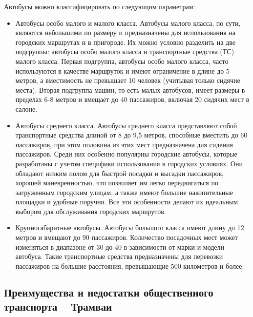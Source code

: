 Автобусы можно классифицировать по следующим параметрам:
\begin{itemize}
	\item Автобусы особо малого и малого класса. Автобусы малого класса, по сути, являются небольшими по размеру и предназначены для использования на городских маршрутах и в пригороде. Их можно условно разделить на две подгруппы: автобусы особо малого класса и транспортные средства (ТС) малого класса.
	Первая подгруппа, автобусы особо малого класса, часто используются в качестве маршруток и имеют ограничение в длине до 5 метров, а вместимость не превышает 10 человек (учитывая только сидячие места).
	Вторая подгруппа машин, то есть малых автобусов, имеет размеры в пределах 6-8 метров и вмещает до 40 пассажиров, включая 20 сидячих мест в салоне.
	\item Автобусы среднего класса. Автобусы среднего класса представляют собой транспортные средства длиной от 8 до 9,5 метров, способные вместить до 60 пассажиров, при этом половина из этих мест предназначена для сидения пассажиров. Среди них особенно популярны городские автобусы, которые разработаны с учетом специфики использования в городских условиях. Они обладают низким полом для быстрой посадки и высадки пассажиров, хорошей маневренностью, что позволяет им легко передвигаться по загруженным городским улицам, а также имеют большие накопительные площадки и удобные поручни. Все эти особенности делают их идеальным выбором для обслуживания городских маршрутов.
	\item Крупногабаритные автобусы. Автобусы большого класса имеют длину до 12 метров и вмещают до 90 пассажиров. Количество посадочных мест может изменяться в диапазоне от 30 до 40 в зависимости от марки и модели автобуса. Такие транспортные средства предназначены для перевозки пассажиров на большие расстояния, превышающие 500 километров и более. 
\end{itemize}

\subsection{Преимущества и недостатки общественного транспорта -- Трамваи}


